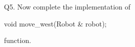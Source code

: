 Q5.
Now complete the implementation of
{\small
\begin{console}
void move_west(Robot & robot);
\end{console}
}
function.


